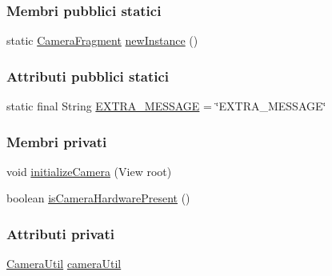 \subsubsection*{Membri pubblici statici}
\begin{DoxyCompactItemize}
\item 
static \hyperlink{classit_1_1unibo_1_1torsello_1_1bluetoothpositioning_1_1fragment_1_1CameraFragment}{Camera\+Fragment} \hyperlink{classit_1_1unibo_1_1torsello_1_1bluetoothpositioning_1_1fragment_1_1CameraFragment_a06506c839e3206fbe082ab705cb627b5_a06506c839e3206fbe082ab705cb627b5}{new\+Instance} ()
\end{DoxyCompactItemize}
\subsubsection*{Attributi pubblici statici}
\begin{DoxyCompactItemize}
\item 
static final String \hyperlink{classit_1_1unibo_1_1torsello_1_1bluetoothpositioning_1_1fragment_1_1CameraFragment_abdda7813302f466435cedfb3641e45b9_abdda7813302f466435cedfb3641e45b9}{E\+X\+T\+R\+A\+\_\+\+M\+E\+S\+S\+A\+GE} = \char`\"{}E\+X\+T\+R\+A\+\_\+\+M\+E\+S\+S\+A\+GE\char`\"{}
\end{DoxyCompactItemize}
\subsubsection*{Membri privati}
\begin{DoxyCompactItemize}
\item 
void \hyperlink{classit_1_1unibo_1_1torsello_1_1bluetoothpositioning_1_1fragment_1_1CameraFragment_a2af65faee5cb478bcf85ef8fd4cee10f_a2af65faee5cb478bcf85ef8fd4cee10f}{initialize\+Camera} (View root)
\item 
boolean \hyperlink{classit_1_1unibo_1_1torsello_1_1bluetoothpositioning_1_1fragment_1_1CameraFragment_ad5779645ad5ed1ba4500a702e014bd47_ad5779645ad5ed1ba4500a702e014bd47}{is\+Camera\+Hardware\+Present} ()
\end{DoxyCompactItemize}
\subsubsection*{Attributi privati}
\begin{DoxyCompactItemize}
\item 
\hyperlink{classit_1_1unibo_1_1torsello_1_1bluetoothpositioning_1_1util_1_1CameraUtil}{Camera\+Util} \hyperlink{classit_1_1unibo_1_1torsello_1_1bluetoothpositioning_1_1fragment_1_1CameraFragment_a127f286f45219c7891d564cc55e2a80e_a127f286f45219c7891d564cc55e2a80e}{camera\+Util}
\end{DoxyCompactItemize}



